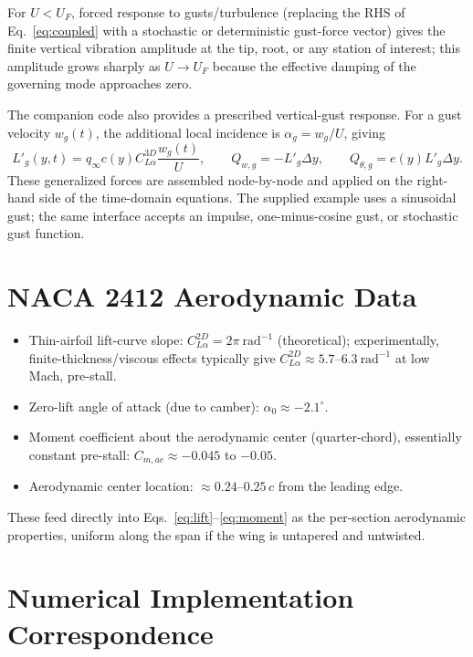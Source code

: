 \documentclass[11pt]{article}
\begin{document}
For $U < U_F$, forced response to gusts/turbulence (replacing the RHS of
Eq.~\eqref{eq:coupled} with a stochastic or deterministic gust-force vector) gives the
finite vertical vibration amplitude at the tip, root, or any station of interest; this
amplitude grows sharply as $U \to U_F$ because the effective damping of the governing
mode approaches zero.

The companion code also provides a prescribed vertical-gust response. For a gust velocity
$w_g(t)$, the additional local incidence is $\alpha_g=w_g/U$, giving
\begin{equation}
 L'_g(y,t)=q_\infty c(y)C_{L\alpha}^{3D}\frac{w_g(t)}{U},\qquad
 Q_{w,g}=-L'_g\Delta y,\qquad Q_{\theta,g}=e(y)L'_g\Delta y.
\end{equation}
These generalized forces are assembled node-by-node and applied on the right-hand side
of the time-domain equations. The supplied example uses a sinusoidal gust; the same
interface accepts an impulse, one-minus-cosine gust, or stochastic gust function.

\section{NACA 2412 Aerodynamic Data}

\begin{itemize}
\item Thin-airfoil lift-curve slope: $C_{L\alpha}^{2D} = 2\pi\ \text{rad}^{-1}$
(theoretical); experimentally, finite-thickness/viscous effects typically give
$C_{L\alpha}^{2D} \approx 5.7$--$6.3\ \text{rad}^{-1}$ at low Mach, pre-stall.
\item Zero-lift angle of attack (due to camber): $\alpha_0 \approx -2.1^\circ$.
\item Moment coefficient about the aerodynamic center (quarter-chord), essentially
constant pre-stall: $C_{m,ac} \approx -0.045$ to $-0.05$.
\item Aerodynamic center location: $\approx 0.24$--$0.25\,c$ from the leading edge.
\end{itemize}
These feed directly into Eqs.~\eqref{eq:lift}--\eqref{eq:moment} as the per-section
aerodynamic properties, uniform along the span if the wing is untapered and untwisted.

\section{Numerical Implementation Correspondence}
\end{document}
